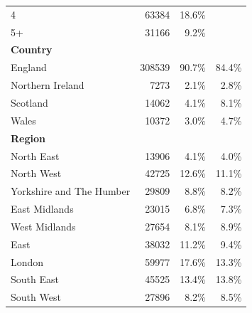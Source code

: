 \begin{tabular}{lrrr}
4 & 63384 & 18.6\% &  \\
5+ & 31166 & 9.2\% &  \\
\hline
\multicolumn{4}{l}{\textbf{Country}} \\
England & 308539 & 90.7\% & 84.4\% \\
Northern Ireland & 7273 & 2.1\% & 2.8\% \\
Scotland & 14062 & 4.1\% & 8.1\% \\
Wales & 10372 & 3.0\% & 4.7\% \\
\hline
\multicolumn{4}{l}{\textbf{Region}} \\
North East & 13906 & 4.1\% & 4.0\% \\
North West & 42725 & 12.6\% & 11.1\% \\
Yorkshire and The Humber & 29809 & 8.8\% & 8.2\% \\
East Midlands & 23015 & 6.8\% & 7.3\% \\
West Midlands & 27654 & 8.1\% & 8.9\% \\
East & 38032 & 11.2\% & 9.4\% \\
London & 59977 & 17.6\% & 13.3\% \\
South East & 45525 & 13.4\% & 13.8\% \\
South West & 27896 & 8.2\% & 8.5\% \\
\hline
\end{tabular}

